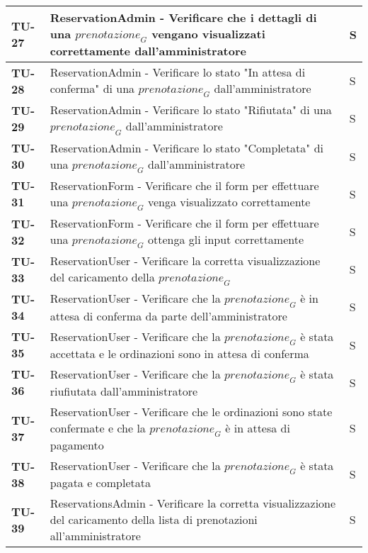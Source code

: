 \begin{longtable}{|>{\centering\arraybackslash}p{1.5cm}|p{15cm}|p{1cm}|}
  \textbf{TU-27} & ReservationAdmin - Verificare che i dettagli di una $\textit{prenotazione}_G$ vengano visualizzati correttamente dall'amministratore & S \\
  \hline
  \rowcolor{gray!10}
  \textbf{TU-28} & ReservationAdmin - Verificare lo stato "In attesa di conferma" di una $\textit{prenotazione}_G$ dall'amministratore  & S \\
  \hline
  \rowcolor{gray!10}
  \textbf{TU-29} & ReservationAdmin - Verificare lo stato "Rifiutata" di una $\textit{prenotazione}_G$ dall'amministratore  & S \\
  \hline
  \rowcolor{gray!10}
  \textbf{TU-30} & ReservationAdmin - Verificare lo stato "Completata" di una $\textit{prenotazione}_G$ dall'amministratore   & S \\
  \hline
  \rowcolor{gray!10}
  \textbf{TU-31} & ReservationForm - Verificare che il form per effettuare una $\textit{prenotazione}_G$ venga visualizzato correttamente  & S \\
  \hline
  \rowcolor{gray!10}
  \textbf{TU-32} & ReservationForm - Verificare che il form per effettuare una $\textit{prenotazione}_G$ ottenga gli input correttamente  & S \\
  \hline
  \rowcolor{gray!10}
  \textbf{TU-33} & ReservationUser - Verificare la corretta visualizzazione del caricamento della $\textit{prenotazione}_G$ & S \\
  \hline
  \rowcolor{gray!10}
  \textbf{TU-34} & ReservationUser - Verificare che la $\textit{prenotazione}_G$ è in attesa di conferma da parte dell'amministratore & S \\
  \hline
  \rowcolor{gray!10}
  \textbf{TU-35} & ReservationUser - Verificare che la $\textit{prenotazione}_G$ è stata accettata e le ordinazioni sono in attesa di conferma & S \\
  \hline
  \rowcolor{gray!10}
  \textbf{TU-36} & ReservationUser - Verificare che la $\textit{prenotazione}_G$ è stata riufiutata dall'amministratore & S \\
  \hline
  \rowcolor{gray!10}
  \textbf{TU-37} & ReservationUser - Verificare che le ordinazioni sono state confermate e che la $\textit{prenotazione}_G$ è in attesa di pagamento & S \\
  \hline
  \rowcolor{gray!10}
  \textbf{TU-38} & ReservationUser - Verificare che la $\textit{prenotazione}_G$ è stata pagata e completata & S \\
  \hline
  \rowcolor{gray!10}
  \textbf{TU-39} & ReservationsAdmin - Verificare la corretta visualizzazione del caricamento della lista di prenotazioni all'amministratore & S \\

\end{longtable}
